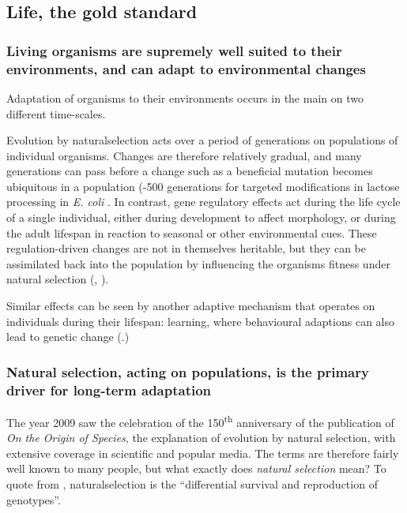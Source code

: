 \subsection{Life, the gold standard}

\subsubsection{Living organisms are supremely well suited to their environments, and can adapt to environmental changes}
\label{living-organisms-are-supremely-well-suited-to-their-environments-and-can-adapt-to-environmental-changes}

Adaptation of organisms to their environments occurs in the main on two
different time-scales.

Evolution by \gls{naturalselection} acts over a period of generations on
populations of individual organisms. Changes are therefore relatively
gradual, and many generations can pass before a change such as a
beneficial mutation becomes ubiquitous in a population (-500
generations for targeted modifications in lactose processing in
\emph{E. coli} \autocite{Dekel:2005fk}. In contrast, gene regulatory
effects act during the life cycle of a single individual, either during
development to affect morphology, or during the adult lifespan in
reaction to seasonal or other environmental cues. These
regulation-driven changes are not in themselves heritable, but they can
be assimilated back into the population by influencing the organisms
fitness under natural selection (\eg,
\autocite{Baldwin:1896ly,Dennett:2003ve,Paenke:2009xe,Paenke:2007ve}).

Similar effects can be seen by another adaptive mechanism that operates
on individuals during their lifespan: learning, where behavioural
adaptions can also lead to genetic change
(\eg \autocite{Hinton:1987vy}.)

\subsubsection{Natural selection, acting on populations, is the primary driver for long-term adaptation}
\label{natural-selection-acting-on-populations-is-the-primary-driver-for-long-term-adaptation}

The year 2009 saw the celebration of the 150\textsuperscript{th}
anniversary of the publication of \emph{On the Origin of Species}, the
explanation of evolution by natural selection, with extensive coverage
in scientific and popular media. The terms are therefore fairly well
known to many people, but what exactly does \emph{natural selection}
mean? To quote from \autocite{Futuyama:1979tg}, \gls{naturalselection}
is the ``differential survival and reproduction of genotypes''.

